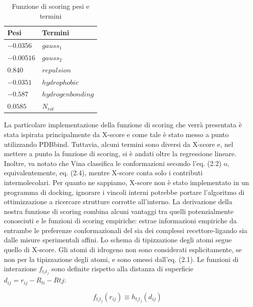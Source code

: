 \begin{table}[H]
    \centering
    \begin{tabular}{|l|l|}
        \hline
        \textbf{Pesi} & \textbf{Termini}\\
        \hline
        $-0.0356$ & $gauss_1$\\
        $-0.00516$ & $gauss_2$\\
        $0.840$ & $repulsion$\\
        $-0.0351$ & $hydrophobic$\\
        $-0.587$ & $hydrogen bonding$\\
        $0.0585$ & $N_{rot}$\\
        \hline
    \end{tabular}
    \caption{Funzione di scoring pesi e termini}
    \label{tab:Tabella Pesi e Termini}
\end{table}

La particolare implementazione della funzione di scoring che verrà presentata è stata ispirata principalmente da X-score e come tale è stato messo a punto utilizzando PDBbind. Tuttavia, alcuni termini sono diversi da X-score e, nel mettere a punto la funzione di scoring, si è andati oltre la regressione lineare. Inoltre, va notato che Vina classifica le conformazioni secondo l'eq. (2.2) o, equivalentemente, eq. (2.4), mentre X-score conta solo i contributi intermolecolari.
Per quanto ne sappiamo, X-score non è stato implementato in un programma di docking, ignorare i vincoli interni potrebbe portare l'algoritmo di ottimizzazione a ricercare strutture corrotte all'interno.\newline
La derivazione della nostra funzione di scoring combina alcuni vantaggi tra quelli potenzialmente conosciuti e le funzioni di scoring empiriche: estrae informazioni empiriche da entrambe le preferenze conformazionali del sia dei complessi recettore-ligando sia dalle misure sperimentali affini.\newline 
Lo schema di tipizzazione degli atomi segue quello di X-score. Gli atomi di idrogeno non sono considerati esplicitamente, se non per la tipizzazione degli atomi, e sono omessi dall'eq. (2.1).\newline
Le funzioni di interazione $f_{t_it_j}$ sono definite rispetto alla distanza di superficie  $d_{ij} = r_{ij} - R_{ti} - Rtj$:

\begin{equation}
    f_{t_it_j}(r_{ij}) \equiv h_{t_it_j}(d_{ij})
\end{equation}

